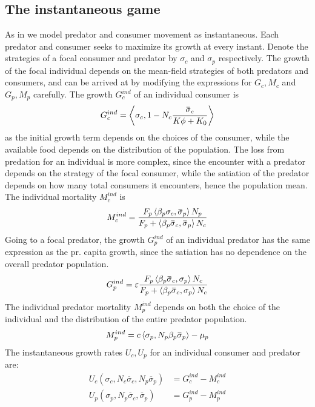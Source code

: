 \subsection{The instantaneous game}
As in  we model predator and consumer movement as instantaneous. Each predator and consumer seeks to maximize its growth at every instant. Denote the strategies of a focal consumer and predator by $\sigma_c$ and $\sigma_p$ respectively.  The growth of the focal individual depends on the mean-field strategies of both predators and consumers, and can be arrived at by modifying the expressions for $G_c,M_c$ and $G_p, M_p$ carefully.
The growth $G_c^{ind}$ of an individual consumer is
\begin{equation}
  G_c^{ind} = \ip{\sigma_c}{1-N_c \frac{\overbar{\sigma}_c}{K\phi + K_0}}
\end{equation}
as the initial growth term depends on the choices of the consumer, while the available food depends on the distribution of the population. The loss from predation for an individual is more complex, since the encounter with a predator depends on the strategy of the focal consumer, while the satiation of the predator depends on how many total consumers it encounters, hence the population mean. The individual mortality $M_c^{ind}$ is
\begin{equation}
  M_c^{ind} =  \frac{F_p \ip{\beta_p \sigma_c}{\overbar{\sigma}_p} N_p}{F_p + \ip{\beta_p \overbar{\sigma}_c}{\overbar{\sigma}_p} N_c}
\end{equation}
Going to a focal predator, the growth $G_p^{ind}$ of an individual predator has the same expression as the pr. capita growth, since the satiation has no dependence on the overall predator population.
\begin{equation}
  G_p^{ind} = \epsilon \frac{F_p \ip{\beta_p \overbar{\sigma}_c}{\sigma_p} N_c}{F_p + \ip{\beta_p \overbar{\sigma}_c}{\sigma_p} N_c}
\end{equation}
The individual predator mortality $M_p^{ind}$ depends on both the choice of the individual and the distribution of the entire predator population.
\begin{equation}
  M_p^{ind} =  c \ip{\sigma_p}{N_p\beta_p \overbar{\sigma}_p}  - \mu_p
\end{equation}
The instantaneous growth rates $U_c,U_p$ for an individual consumer and predator are:
\begin{align}
  U_c(\sigma_c, N_c \overbar{\sigma}_c, N_p\overbar{\sigma}_p) &=  G_c^{ind} - M_c^{ind} \\
  U_p(\sigma_p, N_p \overbar{\sigma}_c, \overbar{\sigma}_p) &= G_p^{ind} - M_p^{ind}
\end{align}
